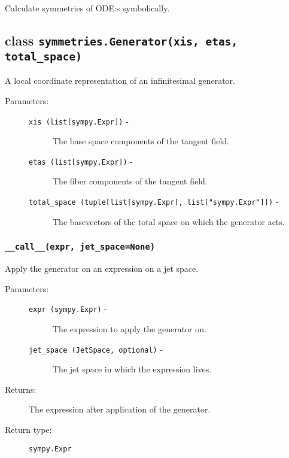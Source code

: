 
Calculate symmetries of ODE:s symbolically.

\subsection*{class \lstinline{symmetries.Generator(xis, etas, total_space)}}

   A local coordinate representation of an infinitesimal generator.

   \begin{description}
      \item[Parameters:] \leavevmode
        \begin{description}
            \item[\lstinline{xis (list[sympy.Expr])} -] The base space components of the tangent field.
            \item[\lstinline{etas (list[sympy.Expr])} -] The fiber components of the tangent field.
            \item[\lstinline{total_space (tuple[list[sympy.Expr], list["sympy.Expr"]])} -] The base\newline vectors of the total space on which the generator acts.
        \end{description}
   \end{description}

   \subsubsection*{\lstinline{__call__(expr, jet_space=None)}}

      Apply the generator on an expression on a jet space.

      \begin{description}
         \item[Parameters:] \leavevmode
           \begin{description}
               \item[\lstinline{expr (sympy.Expr)} -] The expression to apply the generator on.
               \item[\lstinline{jet_space (JetSpace, optional)} -] The jet space in which the expression lives.
           \end{description}
         \item[Returns:] The expression after application of the generator.
         \item[Return type:] \lstinline{sympy.Expr}
      \end{description}
   
